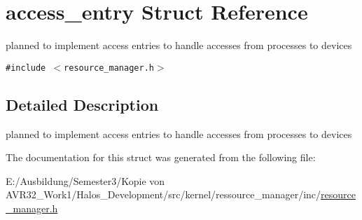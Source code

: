 \hypertarget{structaccess__entry}{
\section{access\_\-entry Struct Reference}
\label{structaccess__entry}
}
planned to implement access entries to handle accesses from processes to devices  


{\tt \#include $<$resource\_\-manager.h$>$}



\subsection{Detailed Description}
planned to implement access entries to handle accesses from processes to devices 

The documentation for this struct was generated from the following file:\begin{CompactItemize}
\item 
E:/Ausbildung/Semester3/Kopie von AVR32\_\-Work1/Halos\_\-Development/src/kernel/ressource\_\-manager/inc/\hyperlink{resource__manager_8h}{resource\_\-manager.h}\end{CompactItemize}
